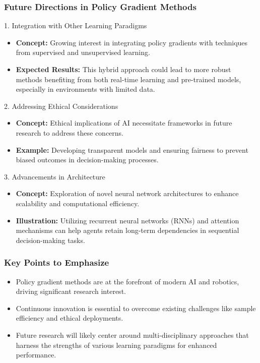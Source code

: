 \documentclass[aspectratio=169]{beamer}
\begin{document}
\begin{frame}[fragile]
    \frametitle{Future Directions in Policy Gradient Methods}
    
    \begin{block}{1. Integration with Other Learning Paradigms}
        \begin{itemize}
            \item \textbf{Concept:} Growing interest in integrating policy gradients with techniques from supervised and unsupervised learning.
            \item \textbf{Expected Results:} This hybrid approach could lead to more robust methods benefiting from both real-time learning and pre-trained models, especially in environments with limited data.
        \end{itemize}
    \end{block}

    \begin{block}{2. Addressing Ethical Considerations}
        \begin{itemize}
            \item \textbf{Concept:} Ethical implications of AI necessitate frameworks in future research to address these concerns.
            \item \textbf{Example:} Developing transparent models and ensuring fairness to prevent biased outcomes in decision-making processes.
        \end{itemize}
    \end{block}
    
    \begin{block}{3. Advancements in Architecture}
        \begin{itemize}
            \item \textbf{Concept:} Exploration of novel neural network architectures to enhance scalability and computational efficiency.
            \item \textbf{Illustration:} Utilizing recurrent neural networks (RNNs) and attention mechanisms can help agents retain long-term dependencies in sequential decision-making tasks.
        \end{itemize}
    \end{block}
\end{frame}

\begin{frame}[fragile]
    \frametitle{Key Points to Emphasize}
    
    \begin{itemize}
        \item Policy gradient methods are at the forefront of modern AI and robotics, driving significant research interest.
        \item Continuous innovation is essential to overcome existing challenges like sample efficiency and ethical deployments.
        \item Future research will likely center around multi-disciplinary approaches that harness the strengths of various learning paradigms for enhanced performance.
    \end{itemize}
\end{frame}
\end{document}
